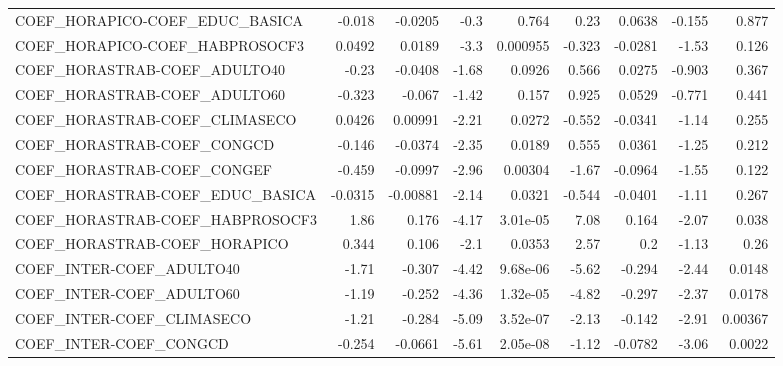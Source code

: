 \begin{tabular}{lrrrrrrrr}
COEF\_HORAPICO-COEF\_EDUC\_BASICA        &      -0.018 &      -0.0205 &    -0.3 &    0.764 &       0.23 &      0.0638 &       -0.155 &         0.877 \\
COEF\_HORAPICO-COEF\_HABPROSOCF3        &      0.0492 &       0.0189 &    -3.3 & 0.000955 &     -0.323 &     -0.0281 &        -1.53 &         0.126 \\
COEF\_HORASTRAB-COEF\_ADULTO40          &       -0.23 &      -0.0408 &   -1.68 &   0.0926 &      0.566 &      0.0275 &       -0.903 &         0.367 \\
COEF\_HORASTRAB-COEF\_ADULTO60          &      -0.323 &       -0.067 &   -1.42 &    0.157 &      0.925 &      0.0529 &       -0.771 &         0.441 \\
COEF\_HORASTRAB-COEF\_CLIMASECO         &      0.0426 &      0.00991 &   -2.21 &   0.0272 &     -0.552 &     -0.0341 &        -1.14 &         0.255 \\
COEF\_HORASTRAB-COEF\_CONGCD            &      -0.146 &      -0.0374 &   -2.35 &   0.0189 &      0.555 &      0.0361 &        -1.25 &         0.212 \\
COEF\_HORASTRAB-COEF\_CONGEF            &      -0.459 &      -0.0997 &   -2.96 &  0.00304 &      -1.67 &     -0.0964 &        -1.55 &         0.122 \\
COEF\_HORASTRAB-COEF\_EDUC\_BASICA       &     -0.0315 &     -0.00881 &   -2.14 &   0.0321 &     -0.544 &     -0.0401 &        -1.11 &         0.267 \\
COEF\_HORASTRAB-COEF\_HABPROSOCF3       &        1.86 &        0.176 &   -4.17 & 3.01e-05 &       7.08 &       0.164 &        -2.07 &         0.038 \\
COEF\_HORASTRAB-COEF\_HORAPICO          &       0.344 &        0.106 &    -2.1 &   0.0353 &       2.57 &         0.2 &        -1.13 &          0.26 \\
COEF\_INTER-COEF\_ADULTO40              &       -1.71 &       -0.307 &   -4.42 & 9.68e-06 &      -5.62 &      -0.294 &        -2.44 &        0.0148 \\
COEF\_INTER-COEF\_ADULTO60              &       -1.19 &       -0.252 &   -4.36 & 1.32e-05 &      -4.82 &      -0.297 &        -2.37 &        0.0178 \\
COEF\_INTER-COEF\_CLIMASECO             &       -1.21 &       -0.284 &   -5.09 & 3.52e-07 &      -2.13 &      -0.142 &        -2.91 &       0.00367 \\
COEF\_INTER-COEF\_CONGCD                &      -0.254 &      -0.0661 &   -5.61 & 2.05e-08 &      -1.12 &     -0.0782 &        -3.06 &        0.0022 \\

\end{tabular}

